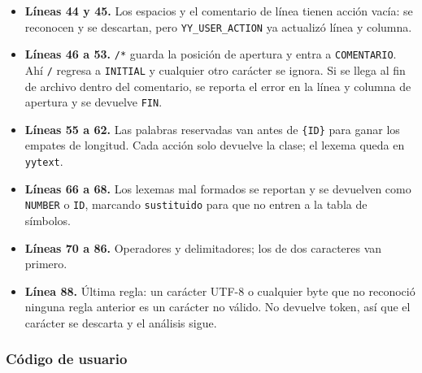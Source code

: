 \documentclass[12pt]{article}
\newcommand{\cmd}[1]{\texttt{\small #1}}
\begin{document}
\begin{itemize}[leftmargin=1.1cm,itemsep=0.25em]
\item \textbf{Líneas 44 y 45.} Los espacios y el comentario de línea tienen acción vacía: se
reconocen y se descartan, pero \cmd{YY\_USER\_ACTION} ya actualizó línea y columna.
\item \textbf{Líneas 46 a 53.} \cmd{/*} guarda la posición de apertura y entra a
\cmd{COMENTARIO}. Ahí \cmd{*/} regresa a \cmd{INITIAL} y cualquier otro carácter se ignora. Si
se llega al fin de archivo dentro del comentario, se reporta el error en la línea y columna de
apertura y se devuelve \cmd{FIN}.
\item \textbf{Líneas 55 a 62.} Las palabras reservadas van antes de \cmd{\{ID\}} para ganar los
empates de longitud. Cada acción solo devuelve la clase; el lexema queda en \cmd{yytext}.
\item \textbf{Líneas 66 a 68.} Los lexemas mal formados se reportan y se devuelven como
\cmd{NUMBER} o \cmd{ID}, marcando \cmd{sustituido} para que no entren a la tabla de símbolos.
\item \textbf{Líneas 70 a 86.} Operadores y delimitadores; los de dos caracteres van primero.
\item \textbf{Línea 88.} Última regla: un carácter UTF-8 o cualquier byte que no reconoció
ninguna regla anterior es un carácter no válido. No devuelve token, así que el carácter se
descarta y el análisis sigue.
\end{itemize}

\subsubsection*{Código de usuario}


\end{document}
